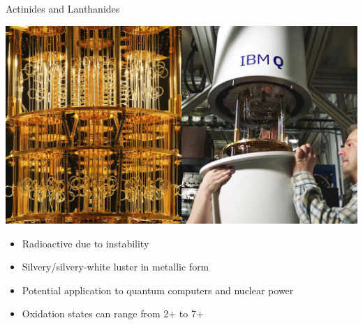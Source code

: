 \documentclass[11pt]{beamer}
\begin{document}
\begin{frame}{Actinides and Lanthanides}
  \begin{center}
    \includegraphics[scale=0.3]{quantum_comp}
  \end{center}

  \begin{itemize}
  \item Radioactive due to instability
  \item Silvery/silvery-white luster in metallic form
  \item Potential application to quantum computers and
    nuclear power
  \item Oxidation states can range from 2+ to 7+
  \end{itemize}
\end{frame}
\end{document}
